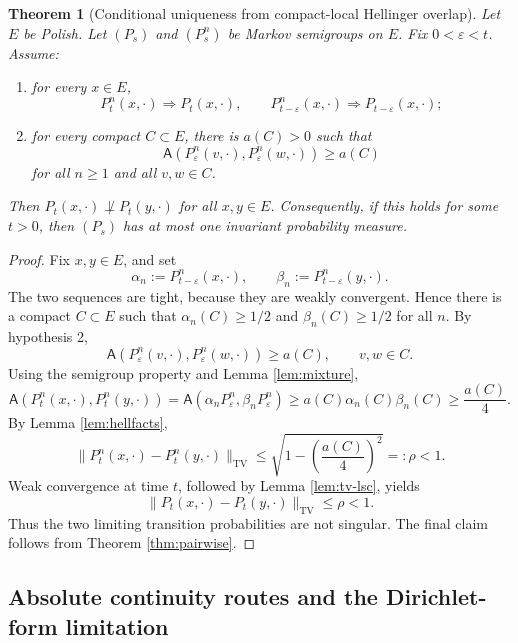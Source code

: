 \documentclass[12pt]{article}
\newcommand{\1}{\mathbf 1}
\newcommand{\TV}{\mathrm{TV}}
\newcommand{\Aff}{\mathsf A}
\theoremstyle{plain}
\newtheorem{theorem}{Theorem}[section]
\theoremstyle{definition}
\theoremstyle{remark}
\numberwithin{equation}{section}
\begin{document}
\begin{theorem}[Conditional uniqueness from compact-local Hellinger overlap]\label{thm:hellinger}
Let \(E\) be Polish.  Let \((P_s)\) and \((P_s^n)\) be Markov semigroups on
\(E\).  Fix \(0<\varepsilon<t\).  Assume:
\begin{enumerate}
\item for every \(x\in E\),
\[
P_t^n(x,\cdot)\Rightarrow P_t(x,\cdot),
\qquad
P_{t-\varepsilon}^n(x,\cdot)\Rightarrow P_{t-\varepsilon}(x,\cdot);
\]
\item for every compact \(C\subset E\), there is \(a(C)>0\) such that
\[
\Aff(P_\varepsilon^n(v,\cdot),P_\varepsilon^n(w,\cdot))\ge a(C)
\]
for all \(n\ge1\) and all \(v,w\in C\).
\end{enumerate}
Then \(P_t(x,\cdot)\not\perp P_t(y,\cdot)\) for all \(x,y\in E\).  Consequently,
if this holds for some \(t>0\), then \((P_s)\) has at most one invariant
probability measure.
\end{theorem}

\begin{proof}
Fix \(x,y\in E\), and set
\[
\alpha_n:=P_{t-\varepsilon}^n(x,\cdot),\qquad
\beta_n:=P_{t-\varepsilon}^n(y,\cdot).
\]
The two sequences are tight, because they are weakly convergent.  Hence there
is a compact \(C\subset E\) such that
\(\alpha_n(C)\ge1/2\) and \(\beta_n(C)\ge1/2\) for all \(n\).  By hypothesis 2,
\[
\Aff(P_\varepsilon^n(v,\cdot),P_\varepsilon^n(w,\cdot))\ge a(C),
\qquad v,w\in C.
\]
Using the semigroup property and Lemma \ref{lem:mixture},
\[
\Aff(P_t^n(x,\cdot),P_t^n(y,\cdot))
=
\Aff(\alpha_nP_\varepsilon^n,\beta_nP_\varepsilon^n)
\ge
a(C)\alpha_n(C)\beta_n(C)\ge \frac{a(C)}4.
\]
By Lemma \ref{lem:hellfacts},
\[
\|P_t^n(x,\cdot)-P_t^n(y,\cdot)\|_{\TV}
\le
\sqrt{1-\left(\frac{a(C)}4\right)^2}
=:\rho<1.
\]
Weak convergence at time \(t\), followed by Lemma \ref{lem:tv-lsc}, yields
\[
\|P_t(x,\cdot)-P_t(y,\cdot)\|_{\TV}\le\rho<1.
\]
Thus the two limiting transition probabilities are not singular.  The final
claim follows from Theorem \ref{thm:pairwise}.
\end{proof}

\subsection{Absolute continuity routes and the Dirichlet-form limitation}
\end{document}
